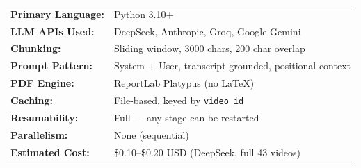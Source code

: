 \documentclass[11pt,a4paper]{article}
\begin{document}
\vspace{1cm}
\begin{tcolorbox}[colback=LightBlue, colframe=DarkBlue, title=\textbf{Technical Summary Table}]
\begin{tabular}{ll}
\textbf{Primary Language:} & Python 3.10+\\
\textbf{LLM APIs Used:} & DeepSeek, Anthropic, Groq, Google Gemini\\
\textbf{Chunking:} & Sliding window, 3000 chars, 200 char overlap\\
\textbf{Prompt Pattern:} & System + User, transcript-grounded, positional context\\
\textbf{PDF Engine:} & ReportLab Platypus (no LaTeX)\\
\textbf{Caching:} & File-based, keyed by \texttt{video\_id}\\
\textbf{Resumability:} & Full --- any stage can be restarted\\
\textbf{Parallelism:} & None (sequential)\\
\textbf{Estimated Cost:} & \$0.10--\$0.20 USD (DeepSeek, full 43 videos)\\
\end{tabular}
\end{tcolorbox}
\end{document}

